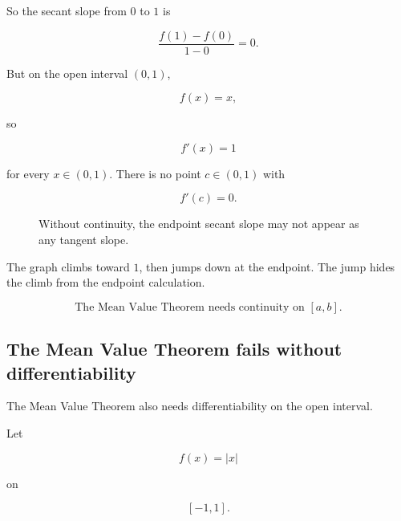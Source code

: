 So the secant slope from \(0\) to \(1\) is

\[
\frac{f(1)-f(0)}{1-0}=0.
\]

But on the open interval \((0,1)\),

\[
f(x)=x,
\]

so

\[
f'(x)=1
\]

for every \(x\in(0,1)\).  There is no point \(c\in(0,1)\) with

\[
f'(c)=0.
\]

\begin{figure}[h]
\centering
{}
\caption{Without continuity, the endpoint secant slope may not appear as any tangent slope.}
\label{fig:mvt-continuity-warning}
\end{figure}

The graph climbs toward \(1\), then jumps down at the endpoint.  The jump hides the
climb from the endpoint calculation.

\[
\boxed{
\text{The Mean Value Theorem needs continuity on }[a,b].
}
\]

\subsection{The Mean Value Theorem fails without differentiability}
\label{subsec:mvt-differentiability-warning}

The Mean Value Theorem also needs differentiability on the open interval.

Let

\[
f(x)=|x|
\]

on

\[
[-1,1].
\]

